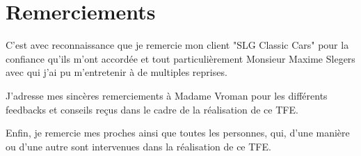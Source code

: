 \setcounter{page}{0}
\section*{Remerciements}

C'est avec reconnaissance que je remercie mon client "SLG Classic Cars" pour la confiance qu'ils m'ont accordée et tout particulièrement Monsieur Maxime Slegers avec qui j'ai pu m'entretenir à de multiples reprises.

\newpara
J'adresse mes sincères remerciements à Madame Vroman pour les différents feedbacks et conseils reçus dans le cadre de la réalisation de ce TFE.

\newpara
Enfin, je remercie mes proches ainsi que toutes les personnes, qui, d'une manière ou d'une autre sont intervenues dans la réalisation de ce TFE. 

